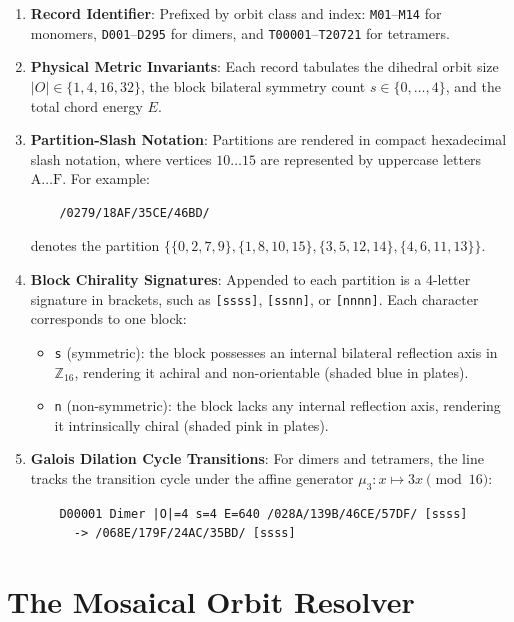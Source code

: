 \begin{enumerate}
    \item \textbf{Record Identifier}:
    Prefixed by orbit class and index: \texttt{M01}--\texttt{M14} for monomers, \texttt{D001}--\texttt{D295} for dimers, and \texttt{T00001}--\texttt{T20721} for tetramers.
    
    \item \textbf{Physical Metric Invariants}:
    Each record tabulates the dihedral orbit size $|O| \in \{1, 4, 16, 32\}$, the block bilateral symmetry count $s \in \{0, \dots, 4\}$, and the total chord energy $E$.
    
    \item \textbf{Partition-Slash Notation}:
    Partitions are rendered in compact hexadecimal slash notation, where vertices $10 \dots 15$ are represented by uppercase letters $\text{A} \dots \text{F}$. For example:
    \begin{verbatim}
    /0279/18AF/35CE/46BD/
    \end{verbatim}
    denotes the partition $\{\{0, 2, 7, 9\}, \{1, 8, 10, 15\}, \{3, 5, 12, 14\}, \{4, 6, 11, 13\}\}$.
    
    \item \textbf{Block Chirality Signatures}:
    Appended to each partition is a 4-letter signature in brackets, such as \texttt{[ssss]}, \texttt{[ssnn]}, or \texttt{[nnnn]}. Each character corresponds to one block:
    \begin{itemize}
        \item \texttt{s} (symmetric): the block possesses an internal bilateral reflection axis in $\mathbb{Z}_{16}$, rendering it achiral and non-orientable (shaded blue in plates).
        \item \texttt{n} (non-symmetric): the block lacks any internal reflection axis, rendering it intrinsically chiral (shaded pink in plates).
    \end{itemize}
    
    \item \textbf{Galois Dilation Cycle Transitions}:
    For dimers and tetramers, the line tracks the transition cycle under the affine generator $\mu_3 \colon x \mapsto 3x \pmod{16}$:
    \begin{verbatim}
    D00001 Dimer |O|=4 s=4 E=640 /028A/139B/46CE/57DF/ [ssss]
      -> /068E/179F/24AC/35BD/ [ssss]
    \end{verbatim}
\end{enumerate}

\section{The Mosaical Orbit Resolver}
\label{sec:lookup-tool}

